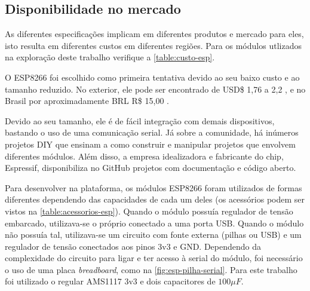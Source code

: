 \clearpage
\subsection{Disponibilidade no mercado}
\label{subsec:mercado-esp}

As diferentes especificações implicam em diferentes produtos e mercado para
eles, isto resulta em diferentes custos em diferentes regiões. Para os módulos
utlizados na exploração deste trabalho verifique a \autoref{table:custo-esp}.

O ESP8266 foi escolhido como primeira tentativa devido ao seu baixo custo e ao
tamanho reduzido. No exterior, ele pode ser encontrado de USD\$ 1,76 a 2,2
\cite{AlibabaESP}, e no Brasil por aproximadamente BRL R\$ 15,00 \cite{mercadolivreEsp}.

\begin{table}[htb]
\end{table}

Devido ao seu tamanho, ele é de fácil integração com demais dispositivos,
bastando o uso de uma comunicação serial. Já sobre a comunidade, há inúmeros
projetos DIY que ensinam a como construir e manipular projetos que envolvem diferentes
módulos. Além disso, a empresa  idealizadora e fabricante do chip, Espressif,
disponibiliza no GitHub projetos com documentação e código aberto.

Para desenvolver na plataforma, os módulos ESP8266 foram utilizados de formas
diferentes dependendo das capacidades de cada um deles (os acessórios podem ser
vistos na \autoref{table:acessorios-esp}). Quando o módulo possuía regulador de
tensão embarcado, utilizava-se o próprio conectado a uma porta USB. Quando o
módulo não possuía tal, utilizava-se um circuito com fonte externa (pilhas ou
USB) e um regulador de tensão conectados aos pinos 3v3 e GND. Dependendo da
complexidade do circuito para ligar e ter acesso à serial do módulo, foi
necessário o uso de uma placa \emph{breadboard}, como na
\autoref{fig:esp-pilha-serial}. Para este trabalho foi utilizado o regular
AMS1117 3v3 e dois capacitores de $100 \mu F$.

